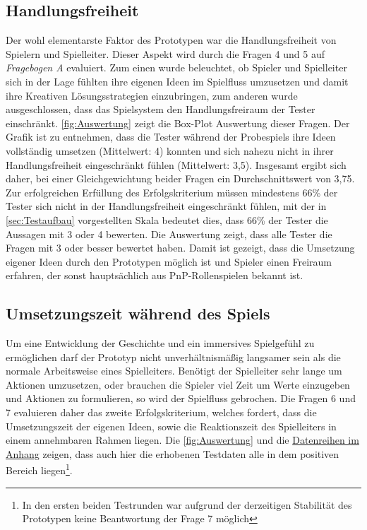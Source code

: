 \subsection{Handlungsfreiheit}
\label{sec:Handlungsfreiheit}
Der wohl elementarste Faktor des Prototypen war die Handlungsfreiheit von Spielern und Spielleiter. Dieser Aspekt wird durch die Fragen 4 und 5 auf \emph{Fragebogen A} evaluiert. Zum einen wurde beleuchtet, ob Spieler und Spielleiter sich in der Lage fühlten ihre eigenen Ideen im Spielfluss umzusetzen und damit ihre Kreativen Lösungsstrategien einzubringen, zum anderen wurde ausgeschlossen, dass das Spielsystem den Handlungsfreiraum der Tester einschränkt.\newline
\ref{fig:Auswertung} zeigt die Box-Plot Auswertung dieser Fragen. Der Grafik ist zu entnehmen, dass die Tester während der Probespiels ihre Ideen vollständig umsetzen (Mittelwert: 4) konnten und sich nahezu nicht in ihrer Handlungsfreiheit eingeschränkt fühlen (Mittelwert: 3,5). Insgesamt ergibt sich daher, bei einer Gleichgewichtung beider Fragen ein Durchschnittswert von 3,75. Zur erfolgreichen Erfüllung des Erfolgskriterium müssen mindestens 66\% der Tester sich nicht in der Handlungsfreiheit eingeschränkt fühlen, mit der in \ref{sec:Testaufbau} vorgestellten Skala bedeutet dies, dass 66\% der Tester die Aussagen mit 3 oder 4 bewerten.\newline
Die Auswertung zeigt, dass alle Tester die Fragen mit 3 oder besser bewertet haben. Damit ist gezeigt, dass die Umsetzung eigener Ideen durch den Prototypen möglich ist und Spieler einen Freiraum erfahren, der sonst hauptsächlich aus PnP-Rollenspielen bekannt ist.


	

\subsection{Umsetzungszeit während des Spiels}
\label{sec:Umsetzungszeit}
Um eine Entwicklung der Geschichte und ein immersives Spielgefühl zu ermöglichen darf der Prototyp nicht unverhältnismäßig langsamer sein als die normale Arbeitsweise eines Spielleiters. Benötigt der Spielleiter sehr lange um Aktionen umzusetzen, oder brauchen die Spieler viel Zeit um Werte einzugeben und Aktionen zu formulieren, so wird der Spielfluss gebrochen. Die Fragen 6 und 7 evaluieren daher das zweite Erfolgskriterium, welches fordert, dass die Umsetzungszeit der eigenen Ideen, sowie die Reaktionszeit des Spielleiters in einem annehmbaren Rahmen liegen.
Die \ref{fig:Auswertung} und die \hyperref[fig:tableData]{Datenreihen im Anhang} zeigen, dass auch hier die erhobenen Testdaten alle in dem positiven Bereich liegen\footnote{In den ersten beiden Testrunden war aufgrund der derzeitigen Stabilität des Prototypen keine Beantwortung der Frage 7 möglich}.

